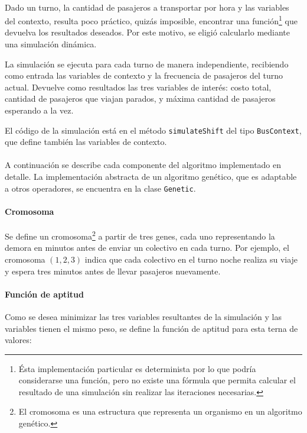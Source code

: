\documentclass{conaiisi}
\begin{document}
\begin{multicols}{2}
\paragraph{}
Dado un turno, la cantidad de pasajeros a transportar por hora y las variables del contexto, resulta poco práctico, quizás imposible, encontrar una función\footnote{Ésta implementación particular es determinista por lo que podría considerarse una función, pero no existe una fórmula que permita calcular el resultado de una simulación sin realizar las iteraciones necesarias.} que devuelva los resultados deseados.
Por este motivo, se eligió calcularlo mediante una simulación dinámica.

La simulación se ejecuta para cada turno de manera independiente, recibiendo como entrada las variables de contexto y la frecuencia de pasajeros del turno actual.
Devuelve como resultados las tres variables de interés: costo total, cantidad de pasajeros que viajan parados, y máxima cantidad de pasajeros esperando a la vez.

El código de la simulación está en el método \texttt{simulateShift} del tipo \texttt{BusContext}, que define también las variables de contexto.

\paragraph{}
A continuación se describe cada componente del algoritmo implementado en detalle.
La implementación abstracta de un algoritmo genético, que es adaptable a otros operadores, se encuentra en la clase \texttt{Genetic}.

\paragraph{Cromosoma}

Se define un cromosoma\footnote{El cromosoma es una estructura que representa un organismo en un algoritmo genético.} a partir de tres genes, cada uno representando la demora en minutos antes de enviar un colectivo en cada turno.
Por ejemplo, el cromosoma $(1,2,3)$ indica que cada colectivo en el turno noche realiza su viaje y espera tres minutos antes de llevar pasajeros nuevamente.

\paragraph{Función de aptitud}

Como se desea minimizar las tres variables resultantes de la simulación y las variables tienen el mismo peso, se define la función de aptitud para esta terna de valores:


\end{multicols}
\end{document}
